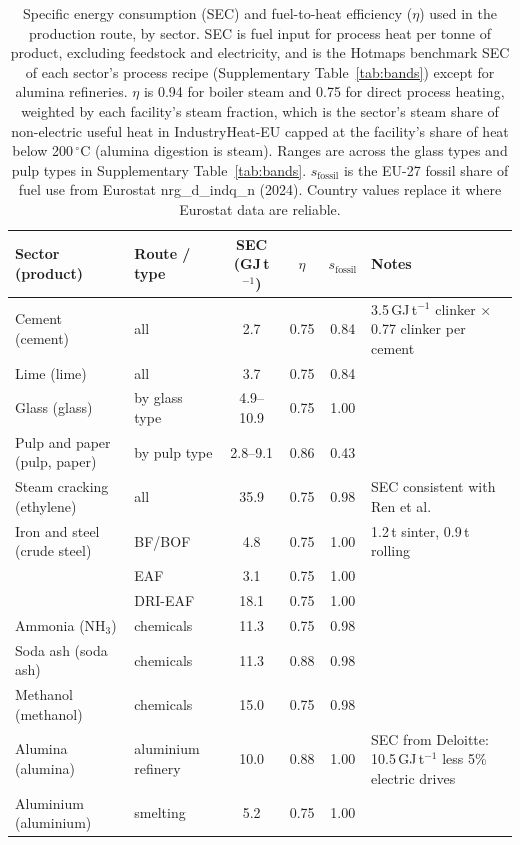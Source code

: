 \documentclass[11pt]{article}
\begin{document}
\begin{table}[h]
\centering
\small
\caption{Specific energy consumption (SEC) and fuel-to-heat efficiency ($\eta$) used in the production route, by sector. SEC is fuel input for process heat per tonne of product, excluding feedstock and electricity, and is the Hotmaps benchmark SEC\cite{hotmaps2018} of each sector's process recipe (Supplementary Table~\ref{tab:bands}) except for alumina refineries. $\eta$ is 0.94 for boiler steam and 0.75 for direct process heating\cite{saad2026}, weighted by each facility's steam fraction, which is the sector's steam share of non-electric useful heat in IndustryHeat-EU\cite{industryheateu2025} capped at the facility's share of heat below 200\,$^\circ$C (alumina digestion is steam\cite{deloitte2022alumina}). Ranges are across the glass types and pulp types in Supplementary Table~\ref{tab:bands}. $s_{\mathrm{fossil}}$ is the EU-27 fossil share of fuel use from Eurostat nrg\_d\_indq\_n (2024)\cite{eurostat_nrg_d_indq_n}. Country values replace it where Eurostat data are reliable.}
\label{tab:sec}
\begin{tabular}{p{2.9cm} p{2.1cm} c c c p{4.6cm}}
\toprule
Sector (product) & Route / type & SEC (GJ\,t$^{-1}$) & $\eta$ & $s_{\mathrm{fossil}}$ & Notes \\
\midrule
Cement (cement) & all & 2.7 & 0.75 & 0.84 & 3.5\,GJ\,t$^{-1}$ clinker $\times$ 0.77 clinker per cement \\
Lime (lime) & all & 3.7 & 0.75 & 0.84 & \\
Glass (glass) & by glass type & 4.9--10.9 & 0.75 & 1.00 & \\
Pulp and paper (pulp, paper) & by pulp type & 2.8--9.1 & 0.86 & 0.43 & \\
Steam cracking (ethylene) & all & 35.9 & 0.75 & 0.98 & SEC consistent with Ren et al.\cite{ren2006} \\
Iron and steel (crude steel) & BF/BOF & 4.8 & 0.75 & 1.00 & 1.2\,t sinter, 0.9\,t rolling \\
 & EAF & 3.1 & 0.75 & 1.00 & \\
 & DRI-EAF & 18.1 & 0.75 & 1.00 & \\
Ammonia (NH$_3$) & chemicals & 11.3 & 0.75 & 0.98 & \\
Soda ash (soda ash) & chemicals & 11.3 & 0.88 & 0.98 & \\
Methanol (methanol) & chemicals & 15.0 & 0.75 & 0.98 & \\
Alumina (alumina) & aluminium refinery & 10.0 & 0.88 & 1.00 & SEC from Deloitte\cite{deloitte2022alumina}: 10.5\,GJ\,t$^{-1}$ less 5\% electric drives \\
Aluminium (aluminium) & smelting & 5.2 & 0.75 & 1.00 & \\
\bottomrule
\end{tabular}
\end{table}
\end{document}
